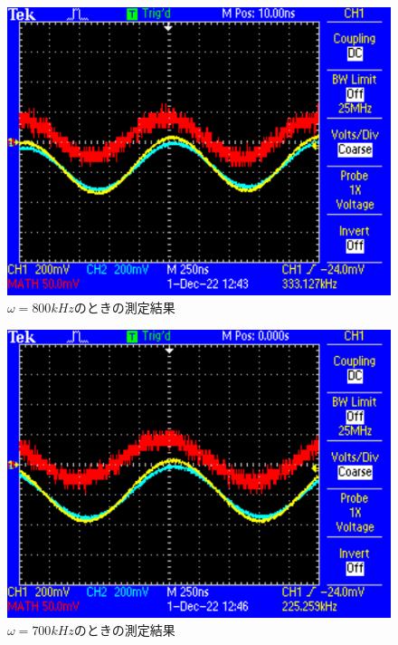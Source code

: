 \begin{figure}[H]
    \centering
    \includegraphics[scale=0.5]{F0003.pdf}
    \caption{$\omega=800\si{kHz}$のときの測定結果}
\end{figure}

\begin{figure}[H]
    \centering
    \includegraphics[scale=0.5]{F0004.pdf}
    \caption{$\omega=700\si{kHz}$のときの測定結果}
\end{figure}

